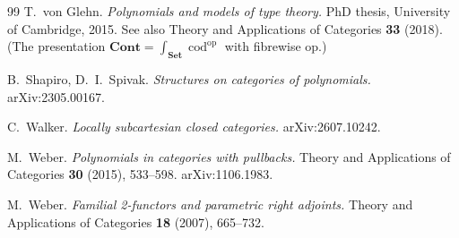 \documentclass[11pt]{amsart}
\theoremstyle{plain}
\theoremstyle{definition}
\theoremstyle{remark}
\newcommand{\Set}{\mathbf{Set}}
\newcommand{\Cont}{\mathbf{Cont}}
\newcommand{\op}{\mathrm{op}}
\DeclareMathOperator{\cod}{cod}
\begin{document}
\begin{thebibliography}{99}
 T.~von Glehn.
\emph{Polynomials and models of type theory.}
PhD thesis, University of Cambridge, 2015. See also Theory and Applications of Categories
\textbf{33} (2018). (The presentation $\Cont=\int_{\Set}\cod^\op$ with fibrewise op.)

 B.~Shapiro, D.~I.~Spivak.
\emph{Structures on categories of polynomials.}
arXiv:2305.00167.

 C.~Walker.
\emph{Locally subcartesian closed categories.}
arXiv:2607.10242.

 M.~Weber.
\emph{Polynomials in categories with pullbacks.}
Theory and Applications of Categories \textbf{30} (2015), 533--598. arXiv:1106.1983.

 M.~Weber.
\emph{Familial 2-functors and parametric right adjoints.}
Theory and Applications of Categories \textbf{18} (2007), 665--732.

\end{thebibliography}
\end{document}
